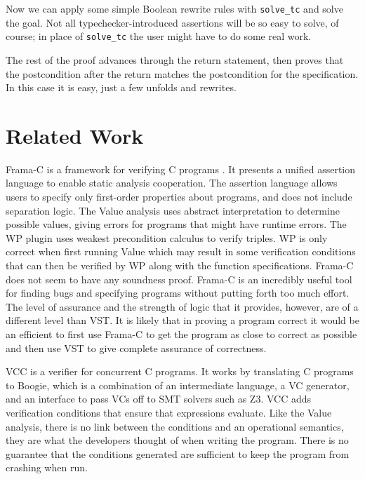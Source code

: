 \documentclass{puthesis}
\begin{document}
Now we can apply some simple Boolean
rewrite rules with \lstinline|solve_tc| and solve the goal.
Not all typechecker-introduced assertions will be so easy
to solve, of course; in place of \lstinline|solve_tc|
the user might have to do some real work.

The rest of the proof advances through the return statement, then proves that
the postcondition after the return matches the postcondition for the 
specification. In this case it is easy, just a few unfolds and rewrites.


\section{Related Work}
Frama-C is a framework for verifying C programs
\cite{cuoq2012frama}. It presents a unified assertion language to
enable static analysis cooperation. The assertion language allows
users to specify only first-order properties about programs, and does
not include separation logic. The Value analysis \cite{canet2009value}
uses abstract interpretation to determine possible values, giving
errors for programs that might have runtime errors. The WP plugin uses
weakest precondition calculus to verify triples.  WP is only correct
when first running Value which may result in some verification
conditions that can then be verified by WP along with the function
specifications. Frama-C does not seem to have any soundness proof.
Frama-C is an incredibly useful tool for finding bugs and specifying
programs without putting forth too much effort. The level of assurance
and the strength of logic that it provides, however, are of a
different level than VST. It is likely that in proving a program
correct it would be an efficient to first use Frama-C to get the
program as close to correct as possible and then use VST to give
complete assurance of correctness.

VCC is a verifier for concurrent C programs. It works by translating C programs to 
Boogie, which is a combination of an intermediate language, a VC generator, and an
interface to pass VCs off to SMT solvers such as Z3.
VCC adds verification conditions that ensure that expressions
evaluate. Like the Value analysis, there is no link between the
conditions and an operational semantics, they are what the developers
thought of when writing the program. There is no guarantee that the
conditions generated are sufficient to keep the program from crashing
when run.
\end{document}
